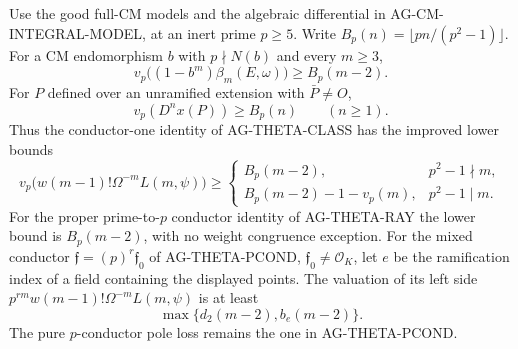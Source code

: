 \begin{proposition}
Use the good full-CM models and the algebraic differential in
AG-CM-INTEGRAL-MODEL, at an inert prime $p\geq5$.  Write
$B_p(n)=\lfloor pn/(p^2-1)\rfloor$.
For a CM endomorphism $b$ with $p\nmid N(b)$ and every $m\geq3$,
\[
 v_p\bigl((1-b^m)\beta_m(E,\omega)\bigr)\geq B_p(m-2).
                                                               \tag{AG-Fourier-BH}
\]
For $P$ defined over an unramified extension with $\bar P\ne O$,
\[
                  v_p(D^n x(P))\geq B_p(n)\qquad(n\geq1).   \tag{AG-Fourier-point}
\]
Thus the conductor-one identity of AG-THETA-CLASS has the improved
lower bounds
\[
 v_p\bigl(w(m-1)!\Omega^{-m}L(m,\psi)\bigr)\geq
 \begin{cases}
 B_p(m-2),&p^2-1\nmid m,\\
 B_p(m-2)-1-v_p(m),&p^2-1\mid m.
 \end{cases}                                               \tag{AG-Fourier-class}
\]
For the proper prime-to-$p$ conductor identity of AG-THETA-RAY the
lower bound is $B_p(m-2)$, with no weight congruence exception.
For the mixed conductor $\mathfrak f=(p)^r\mathfrak f_0$ of
AG-THETA-PCOND, $\mathfrak f_0\ne\mathcal O_K$, let $e$ be the
ramification index of a field containing the displayed points.  The
valuation of its left side
$p^{rm}w(m-1)!\Omega^{-m}L(m,\psi)$ is at least
\[
                         \max\{d_2(m-2),b_e(m-2)\}.         \tag{AG-Fourier-mixed}
\]
The pure $p$-conductor pole loss remains the one in AG-THETA-PCOND.
\end{proposition}

